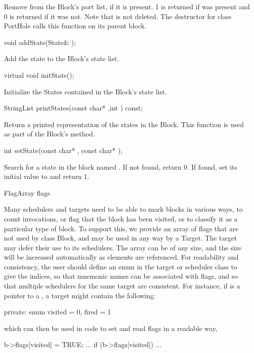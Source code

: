 Remove  from the Block's port list, if it is present.
1 is returned if  was present and 0 is returned if it
was not.  Note that  is not deleted.  The destructor
for class PortHole calls this function on its parent block.

\begin{example}
void addState(State& );
\end{example}

Add the state  to the Block's state list.

\begin{example}
virtual void initState();
\end{example}

Initialize the States contained in the Block's state list.

\begin{example}
StringList printStates(const char* ,int ) const;
\end{example}

Return a printed representation of the states in the Block.  This
function is used as part of the Block's  method.

\begin{example}
int setState(const char* , const char* );
\end{example}

Search for a state in the block named .  If not found,
return 0.  If found, set its initial value to  and
return 1.

\begin{example}
FlagArray flags
\end{example}

Many schedulers and targets need to be able to mark blocks
in various ways, to count invocations, or flag
that the block has been visited, or to classify it
as a particular type of block.  To support this,
we provide an array of flags that are not used
by class Block, and may be used in any way by a Target.
The target may defer their use to its schedulers.
The array can be of any size, and the size
will be increased automatically as elements are referenced.
For readability and consistency, the user should define an enum
in the target or scheduler class to give the indices,
so that mnemonic names
can be associated with flags, and so that multiple schedulers
for the same target are consistent.
For instance, if  is a pointer to a ,
a target might contain the following:
\begin{example}
private:
   enum {
      visited = 0,
      fired = 1
   }
\end{example}
which can then be used in code to set and read flags in a
readable way,
\begin{example}
   b->flags[visited] = TRUE;
   ...
   if (b->flags[visited]) { ... }
\end{example}

